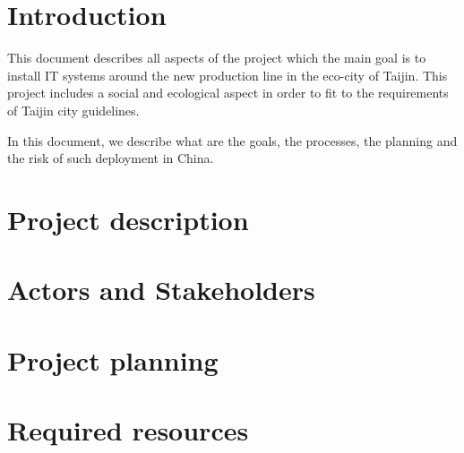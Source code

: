\documentclass{article}
\begin{document}
\section{Introduction}

This document describes all aspects of the \projectname project which the main goal is to install IT systems around the new production line in the eco-city of Taijin.
This project includes a social and ecological aspect in order to fit to the requirements of Taijin city guidelines.

In this document, we describe what are the goals, the processes, the planning and the risk of such deployment in China.

\section{Project description}




\section{Actors and Stakeholders}




\section{Project planning}




\section{Required resources}
\end{document}
